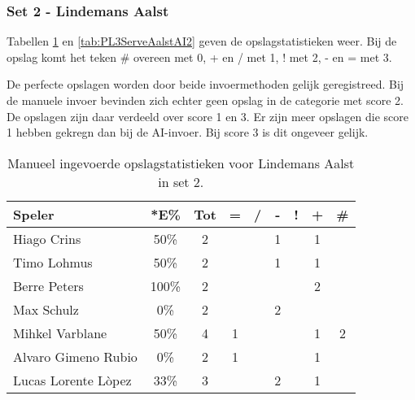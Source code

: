 \subsubsection{Set 2 - Lindemans Aalst}
\label{sec:PL3_Aalst2}

Tabellen  \ref{tab:PL3ServeAalstMan2} en \ref{tab:PL3ServeAalstAI2} geven de opslagstatistieken weer. Bij de opslag komt het teken \# overeen met 0, + en / met 1, ! met 2, - en = met 3.

De perfecte opslagen worden door beide invoermethoden gelijk geregistreed. Bij de manuele invoer bevinden zich echter geen opslag in de categorie met score 2. De opslagen zijn daar verdeeld over score 1 en 3. Er zijn meer opslagen die score 1 hebben gekregn dan bij de AI-invoer. Bij score 3 is dit ongeveer gelijk.

\begin{table}[ht!]
    \centering
    \scriptsize
    \begin{tabular}{|l|c|c|c|c|c|c|c|c|}
        \hline
        \textbf{Speler} & *E\% & Tot & = & / & - & ! & + & \# \\ \hline
        Hiago Crins & 50\% & 2 &  &  & 1 &  & 1 &  \\
        Timo Lohmus & 50\% & 2 &  &  & 1 &  & 1 & \\ 
        Berre Peters & 100\% & 2 &  &  &  &  & 2 &\\ 
        Max Schulz & 0\% & 2 &  &  & 2 &  &  & \\ 
        Mihkel Varblane & 50\% & 4 & 1 &  &  & & 1 & 2 \\ 
        Alvaro Gimeno Rubio & 0\% & 2 & 1 &  &  &  & 1 &  \\ 
        Lucas Lorente Lòpez & 33\% & 3 &  &  & 2 &  & 1 & \\ \hline
    \end{tabular}
   \caption[Manueel ingevoerde opslagstatistieken voor Lindemans Aalst in set 2]{\label{tab:PL3ServeAalstMan2}Manueel ingevoerde opslagstatistieken voor Lindemans Aalst in set 2.}
\end{table}

